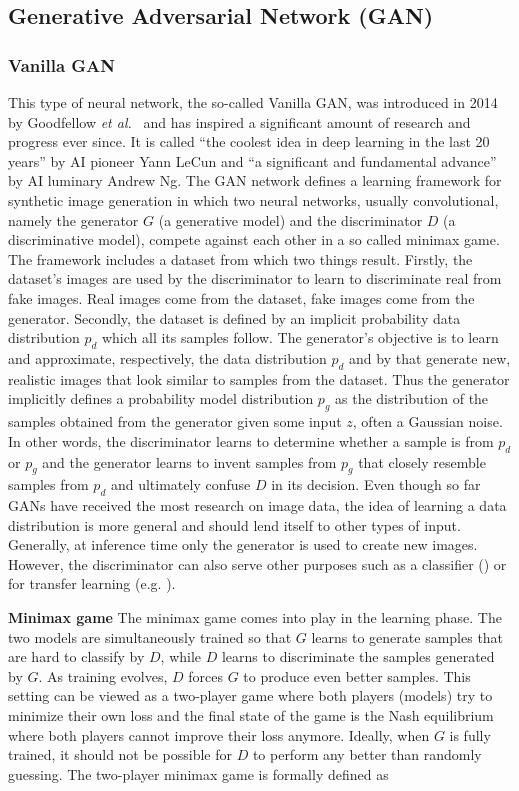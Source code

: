 \documentclass[12pt,a4paper]{article}
\begin{document}
\subsection{Generative Adversarial Network (GAN)}
\subsubsection{Vanilla GAN}
This type of neural network, the so-called Vanilla GAN, was introduced in 2014 by Goodfellow \textit{et al.}~\cite{1406.2661} and has inspired a significant amount of research and progress ever since. It is called ``the coolest idea in deep learning in the last 20 years'' by AI pioneer Yann LeCun and ``a significant and fundamental advance'' by AI luminary Andrew Ng. The GAN network defines a learning framework for synthetic image generation in which two neural networks, usually convolutional, namely the generator $G$ (a generative model) and the discriminator $D$ (a discriminative model), compete against each other in a so called minimax game. The framework includes a dataset from which two things result. Firstly, the dataset's images are used by the discriminator to learn to discriminate real from fake images. Real images come from the dataset, fake images come from the generator. Secondly, the dataset is defined by an implicit probability data distribution $p_d$ which all its samples follow. The generator's objective is to learn and approximate, respectively, the data distribution $p_d$ and by that generate new, realistic images that look similar to samples from the dataset. Thus the generator implicitly defines a probability model distribution $p_g$ as the distribution of the samples obtained from the generator given some input $z$, often a Gaussian noise. In other words, the discriminator learns to determine whether a sample is from $p_d$ or $p_g$ and the generator learns to invent samples from $p_g$ that closely resemble samples from $p_d$ and ultimately confuse $D$ in its decision. Even though so far GANs have received the most research on image data, the idea of learning a data distribution is more general and should lend itself to other types of input. Generally, at inference time only the generator is used to create new images. However, the discriminator can also serve other purposes such as a classifier (\cite{ImprTechn4TrainGANs}) or for transfer learning (e.g. \cite{SpotArtifacts}).
\par \textbf{Minimax game} The minimax game comes into play in the learning phase. The two models are simultaneously trained so that $G$ learns to generate samples that are hard to classify by $D$, while $D$ learns to discriminate the samples generated by $G$. As training evolves, $D$ forces $G$ to produce even better samples. This setting can be viewed as a two-player game where both players (models) try to minimize their own loss and the final state of the game is the Nash equilibrium where both players cannot improve their loss anymore. Ideally, when $G$ is fully trained, it should not be possible for $D$ to perform any better than randomly guessing. The two-player minimax game is formally defined as
\end{document}
